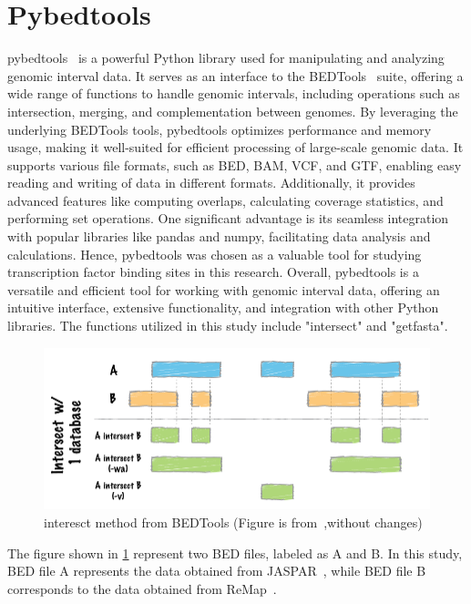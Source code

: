 \documentclass{PHlab-thesis}
\begin{document}
\section{Pybedtools}
pybedtools~\cite{10.1093/bioinformatics/btr539} is a powerful Python library used for manipulating and analyzing genomic interval data. It serves as an interface to the BEDTools~\cite{10.1093/bioinformatics/btq033} suite, offering a wide range of functions to handle genomic intervals, including operations such as intersection, merging, and complementation between genomes. By leveraging the underlying BEDTools tools, pybedtools optimizes performance and memory usage, making it well-suited for efficient processing of large-scale genomic data. It supports various file formats, such as BED, BAM, VCF, and GTF, enabling easy reading and writing of data in different formats. Additionally, it provides advanced features like computing overlaps, calculating coverage statistics, and performing set operations. One significant advantage is its seamless integration with popular libraries like pandas and numpy, facilitating data analysis and calculations. Hence, pybedtools was chosen as a valuable tool for studying transcription factor binding sites in this research. Overall, pybedtools is a versatile and efficient tool for working with genomic interval data, offering an intuitive interface, extensive functionality, and integration with other Python libraries. The functions utilized in this study include "intersect" and "getfasta".
\begin{figure}[H]
	\centering
	\includegraphics[scale=0.5]{figures/intersect-glyph.png}
	\caption{interesct method from BEDTools (Figure is from~\cite{10.1093/bioinformatics/btq033},without changes)}
	\label{fig:interesct} %
\end{figure}
The figure shown in \ref*{fig:interesct} represent two BED files, labeled as A and B. In this study, BED file A represents the data obtained from JASPAR~\cite{10.1093/nar/gkab1113}, while BED file B corresponds to the data obtained from ReMap~\cite{ReMapFayrouz2022}.
\end{document}
